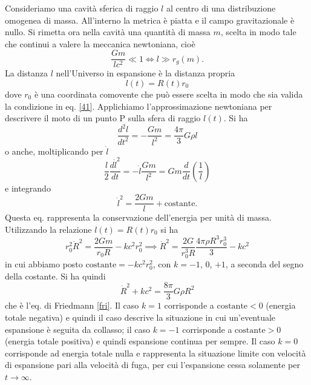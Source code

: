 Consideriamo una cavità sferica di raggio $l$ al centro di una distribuzione
omogenea di massa.  All'interno la metrica è piatta e il campo gravitazionale è
nullo.  Si rimetta ora nella cavità una quantità di massa $m$, scelta in modo
tale che continui a valere la meccanica newtoniana, cioè
\begin{equation}
  \frac{Gm}{l c^2} \ll 1 \iff l \gg r_g(m).
  \label{41}
\end{equation}
La distanza $l$ nell'Universo in espansione è la distanza propria
\begin{equation}
  l(t) = R(t) r_0
\end{equation}
dove $r_0$ è una coordinata comovente che può essere scelta in modo che sia
valida la condizione in eq. \eqref{41}.  Applichiamo l'approssimazione
newtoniana per descrivere il moto di un punto P sulla sfera di raggio $l(t)$.
Si ha
\begin{equation}
  \frac{d^2 l}{dt^2} = -\frac{G m}{l^2} = \frac{4 \pi}{3} G \rho l
  \label{1103}
\end{equation}
o anche, moltiplicando per $\dot l$
\begin{equation}
  \frac{l}{2} \frac{d \dot{l}^2}{dt} = - \dot{l} \frac{G m}{l^2} = Gm  \frac {d}
  {dt} \left( \frac{1}{l} \right)
\end{equation}
e integrando
\begin{equation}
  \dot{l}^2 = \frac{2G m}{l} + \text{costante}.
  \label{219}
\end{equation}
Questa eq. rappresenta la conservazione dell'energia per unità di massa.
Utilizzando la relazione $l(t)=R(t) r_0$ si ha
\begin{equation}
  r_0^2 \dot{R}^2 = \frac{2Gm}{r_0 R} - k c^2 r_0^2
  \implies \dot{R}^2 = \frac{2G}{r_0^3 R} \frac{4 \pi \rho R^3 r_0^3}{3} - k c^2
\end{equation}
in cui abbiamo posto $\text{costante} = - k c^2 r_0^2$, con $k=-1$, $0$, $+1$, a
seconda del segno della costante.  Si ha quindi
\begin{equation}
  \dot{R}^2 + k c^2 = \frac{8 \pi}{3} G \rho R^2
  \label{1106}
\end{equation}
che è l'eq. di Friedmann \eqref{fri}.  Il caso $k=1$ corrisponde a
$\text{costante}<0$ (energia totale negativa) e quindi il caso descrive la
situazione in cui un'eventuale espansione è seguita da collasso; il caso $k=-1$
corrisponde a $\text{costante}>0$ (energia totale positiva) e quindi espansione
continua per sempre.  Il caso $k=0$ corrisponde ad energia totale nulla e
rappresenta la situazione limite con velocità di espansione pari alla velocità
di fuga, per cui l'espansione cessa solamente per $t\to \infty$.

